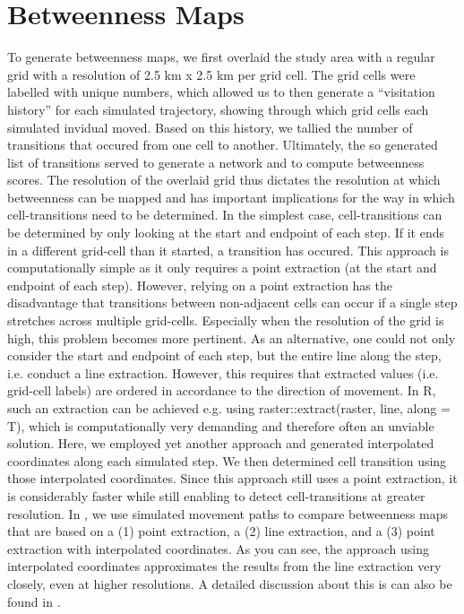 \documentclass[abstract=off,10pt,a4paper,bibliography=totocnumbered]{article}
\begin{document}
\section{Betweenness Maps}
To generate betweenness maps, we first overlaid the study area with a regular
grid with a resolution of 2.5 km x 2.5 km per grid cell. The grid cells were
labelled with unique numbers, which allowed us to then generate a ``visitation
history'' for each simulated trajectory, showing through which grid cells each
simulated invidual moved. Based on this history, we tallied the number of
transitions that occured from one cell to another. Ultimately, the so generated
list of transitions served to generate a network and to compute betweenness
scores. The resolution of the overlaid grid thus dictates the resolution at
which betweenness can be mapped and has important implications for the way in
which cell-transitions need to be determined. In the simplest case,
cell-transitions can be determined by only looking at the start and endpoint of
each step. If it ends in a different grid-cell than it started, a transition has
occured. This approach is computationally simple as it only requires a point
extraction (at the start and endpoint of each step). However, relying on a point
extraction has the disadvantage that transitions between non-adjacent cells can
occur if a single step stretches across multiple grid-cells. Especially when the
resolution of the grid is high, this problem becomes more pertinent. As an
alternative, one could not only consider the start and endpoint of each step,
but the entire line along the step, i.e. conduct a line extraction. However,
this requires that extracted values (i.e. grid-cell labels) are ordered in
accordance to the direction of movement. In R, such an extraction can be
achieved e.g. using \textsf{raster::extract(raster, line, along = T)}, which is
computationally very demanding and therefore often an unviable solution. Here,
we employed yet another approach and generated interpolated coordinates along
each simulated step. We then determined cell transition using those interpolated
coordinates. Since this approach still uses a point extraction, it is
considerably faster while still enabling to detect cell-transitions at greater
resolution. In , we use simulated movement paths to
compare betweenness maps that are based on a (1) point extraction, a (2) line
extraction, and a (3) point extraction with interpolated coordinates. As you can
see, the approach using interpolated coordinates approximates the results from
the line extraction very closely, even at higher resolutions. A detailed
discussion about this is can also be found in \citep{BastilleRousseau.2018}.
\end{document}
